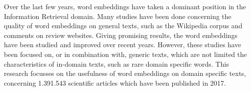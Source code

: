 \documentclass[../../Thesis.tex]{subfiles}
\begin{document}
Over the last few years, word embeddings have taken a dominant position in the Information Retrieval domain. Many studies have been done concerning the quality of word embeddings on general texts, such as the Wikipedia corpus and comments on review websites. Giving promising results, the word embeddings have been studied and improved over recent years. However, these studies have been focused on, or in combination with, generic texts, which are not limited the characteristics of in-domain texts, such as rare domain specific words. This research focusses on the usefulness of word embeddings on domain specific texts, concerning 1.391.543 scientific articles which have been published in 2017.
\end{document}
